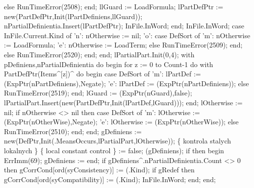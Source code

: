                else RunTimeError(2508);
            end;
            llGuard := LoadFormula;
            lPartDefPtr := new(PartDefPtr,Init(lPartDefiniens,llGuard));
            nPartialDefinientia.Insert(lPartDefPtr);
            InFile.InWord;
         end;
         InFile.InWord;
         case InFile.Current.Kind of
            'n': nOtherwise := nil;
            'o':
               case DefSort of
                  'm': nOtherwise := LoadFormula;
                  'e': nOtherwise := LoadTerm;
                  else RunTimeError(2509);
               end;
            else RunTimeError(2520);
         end;
      end;
      lPartialPart.Init(0,4);
      with pDefiniens,nPartialDefinientia do
      begin
         for z := 0 to Count-1 do
            with PartDefPtr(Items^[z])^ do
         begin
            case DefSort of
               'm': lPartDef := (ExpPtr(nPartDefiniens),Negate);
               'e': lPartDef := (ExpPtr(nPartDefiniens));
               else RunTimeError(2519);
            end;
            lGuard := (ExpPtr(nGuard),false);
            lPartialPart.Insert(new(PartDefPtr,Init(lPartDef,lGuard)));
         end;
         lOtherwise := nil;
         if nOtherwise <> nil then
            case DefSort of
               'm': lOtherwise := (ExpPtr(nOtherWise),Negate);
               'e': lOtherwise := (ExpPtr(nOtherWise));
               else RunTimeError(2510);
            end;
      end;
      gDefiniens := new(DefPtr,Init(.MeansOccurs,lPartialPart,lOtherwise));
      \{ kontrola stalych lokalnych \}
      \{ local constant control \}
       := false;
      (gDefiniens);
      if  then
      begin ErrImm(69); gDefiniens :=  end;
      if gDefiniens^.nPartialDefinientia.Count <> 0 then
         gCorrCond[ord(syConsistency)] := (.Kind);
      if gRedef then gCorrCond[ord(syCompatibility)] := (.Kind);
      InFile.InWord;
   end;
end;
\eatline
